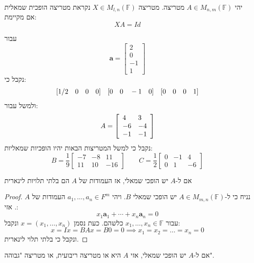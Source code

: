 \documentclass{tstextbook}
\begin{document}
\begin{definition}
יהי \(A \in M_{n,m}\left( \mathbb{F}  \right)\) מטריצה. מטריצה \(X \in M_{l,n}\left( \mathbb{F}  \right)\) נקראת מטריצה הופכית שמאלית אם מקיימת:
$$XA=Id$$

\end{definition}
\begin{example}
עבור
$$\mathbf{a}={\left[\begin{array}{c}{2}\\ {0}\\ {-1}\\ {1}\end{array}\right]}$$
נקבל כי:
$$\begin{array}{l l l l l}{{\left[1/2\quad0\quad0\quad0\right]}}&{{\left[0\quad0\quad-1\quad0\right]}}&{{\left[0\quad0\quad0\quad1\right]}}\end{array}$$
ולמשל עבור:
$$A={\left[\begin{array}{l l}{4}&{3}\\ {-6}&{-4}\\ {-1}&{-1}\end{array}\right]}$$
נקבל כי למשל המטריצות הבאות יהיו הופכיות שמאליות:
$$B={\frac{1}{9}}\begin{bmatrix}-7&-8&11\\ 11&10&-16\end{bmatrix}\quad\quad C={\frac{1}{2}}\begin{bmatrix}0&-1&4\\ 0&1&-6\end{bmatrix}$$

\end{example}
\begin{proposition}
אם ל-\(A\) יש הופכי שמאלי, אז העמודות של \(A\) הם בלתי תלויות לינארית

\end{proposition}
\begin{proof}
נניח כי ל-\(A \in M_{m,n}\left( \mathbb{F}  \right)\) יש הופכי שמאלי \(B\). ויהי \(a_{1},\dots,a_{n}\in F^{m}\) העמודות של \(A\). אזי:
$$x_{1}\mathbf{a}_{1}+\cdots+x_{n}\mathbf{a}_{n}=0$$
עבור \(x_{1},\dots,x_{n}\in \mathbb{F}\) כלשהם. כעת נסמן \(x=\left( x_{1},\dots,x_{n} \right)\) ונקבל:
$$x=Ix=BAx=B 0 = 0\implies x_{1}=x_{2}=\dots=x_{n}=0$$
ונקבל כי בלתי תלוי לינארית.

\end{proof}
\begin{corollary}
אם ל-\(A\) יש הופכי שמאלי, אזי \(A\) היא או מטריצה ריבועית, או מטריצה "גבוהה".

\end{corollary}
\end{document}
